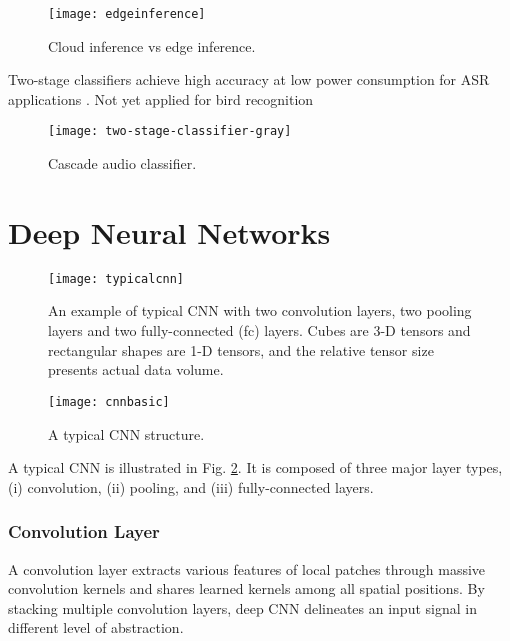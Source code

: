 	
\begin{figure}[H]
\centering
	\texttt{[image: edgeinference]}
	\caption{Cloud inference vs edge inference.}
\end{figure}


Two-stage classifiers achieve high accuracy at low power consumption for ASR applications \citep{Sigtia2018, Price2018, Yin2018}.
		 Not yet applied for bird recognition
		

\begin{figure}
\centering
\texttt{[image: two-stage-classifier-gray]}
\caption{Cascade audio classifier.}
\label{two-stage-classifier-gray}
\end{figure}

\FloatBarrier

\section{Deep Neural Networks}


\begin{figure}%
\centering
\texttt{[image: typicalcnn]}
\caption{An example of typical CNN with two convolution
layers, two pooling layers and two fully-connected (fc) layers.
Cubes are 3-D tensors and rectangular shapes are 1-D tensors,
and the relative tensor size presents actual data volume.}
\label{typicalcnn}
\end{figure}

\begin{figure}
\centering
\texttt{[image: cnnbasic]}
\caption{A typical CNN structure.}
\label{cnnbasic}
\end{figure}


A typical CNN is illustrated in Fig. \ref{typicalcnn}. It is composed of three major layer types, (i) convolution, (ii) pooling, and (iii) fully-connected layers.

\subsubsection*{Convolution Layer}

A convolution layer extracts various features of local patches through massive convolution kernels and shares learned kernels among all spatial positions. By stacking multiple convolution layers, deep CNN delineates an input signal in different level of abstraction.

